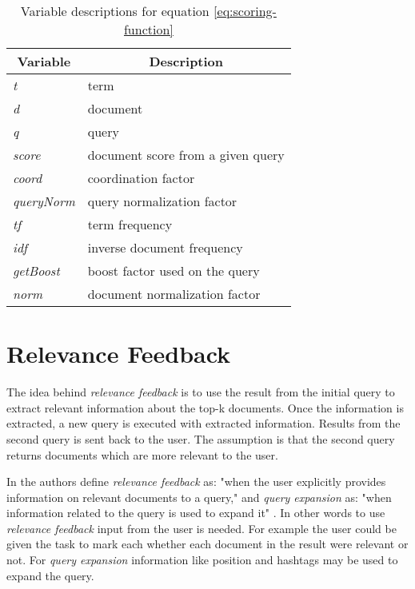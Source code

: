 \begin{table}
		\centering
    \begin{tabular}{|l|l|}
    \hline
		\multicolumn{1}{|c|}{\bfseries Variable} & \multicolumn{1}{|c|}{\bfseries Description} \\ \hline
    \textit{t}         & term                           		\\ \hline
    \textit{d}         & document                       		\\ \hline
    \textit{q}         & query                          		\\ \hline
		\textit{score}     & document score from a given query	\\ \hline
    \textit{coord}     & coordination factor            		\\ \hline
    \textit{queryNorm} & query normalization factor     		\\ \hline
    \textit{tf}        & term frequency                 		\\ \hline
    \textit{idf}       & inverse document frequency     		\\ \hline
    \textit{getBoost}  & boost factor used on the query 		\\ \hline
    \textit{norm}      & document normalization factor  		\\ \hline
    \end{tabular}
		\caption{Variable descriptions for equation \ref{eq:scoring-function}}
		\label{tbl:scoring-function}
\end{table}

\section{Relevance Feedback}
The idea behind \textit{relevance feedback} is to use the result from the initial query to extract relevant information about the top-k documents.
Once the information is extracted, a new query is executed with extracted information.
Results from the second query is sent back to the user.
The assumption is that the second query returns documents which are more relevant to the user.

In \cite{ir-book} the authors define \textit{relevance feedback} as: "when the user explicitly provides information on relevant documents to a query,"
and \textit{query expansion} as: "when information related to the query is used to expand it" \cite[p. 177]{ir-book}.
In other words to use \textit{relevance feedback} input from the user is needed.
For example the user could be given the task to mark each whether each document in the result were relevant or not.
For \textit{query expansion} information like position and hashtags may be used to expand the query.

